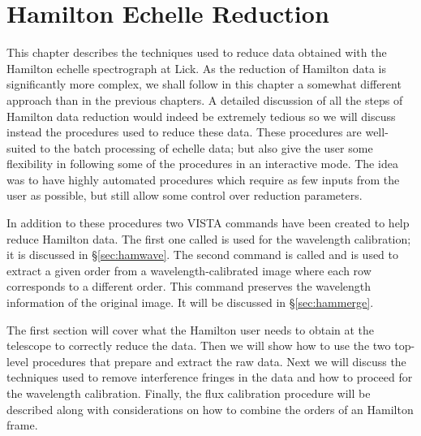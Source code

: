 %
%
%
%
%
%


%
%
%
%
%

\chapter{Hamilton Echelle Reduction}

This chapter describes the techniques used to reduce data obtained with the
Hamilton echelle spectrograph at Lick.  As the reduction of Hamilton data is
significantly more complex, we shall follow in this chapter a somewhat
different approach than in the previous chapters.  A detailed discussion of
all the steps of Hamilton data reduction would indeed be extremely tedious so
we will discuss instead the procedures used to reduce these data. These
procedures are well-suited to the batch processing of echelle data; but also
give the user some flexibility in following some of the procedures in an
interactive mode.  The idea was to have highly automated procedures which
require as few inputs from the user as possible, but still allow some control
over reduction parameters.

In addition to these procedures two VISTA commands have been created to help
reduce Hamilton data.  The first one called  is used for the
wavelength calibration; it is discussed in \S\ref{sec:hamwave}.  The second
command is called  and is used to extract a given order from a
wavelength-calibrated image where each row corresponds to a different order.
This command preserves the wavelength information of the original image.  It
will be discussed in \S\ref{sec:hammerge}.

The first section will cover what the Hamilton user needs to obtain at the
telescope to correctly reduce the data.  Then we will show how to use the two
top-level procedures that prepare and extract the raw data. Next we will
discuss the techniques used to remove interference fringes in the data and how
to proceed for the wavelength calibration. Finally, the flux calibration
procedure will be described along with considerations on how to combine the
orders of an Hamilton frame.

